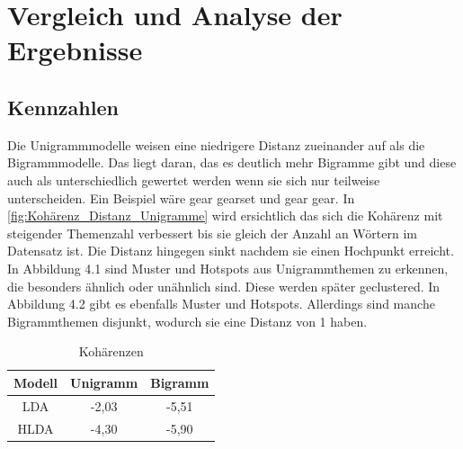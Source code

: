 \chapter{Vergleich und Analyse der Ergebnisse}




\section{Kennzahlen}

Die Unigrammmodelle weisen eine niedrigere Distanz zueinander auf als die Bigrammmodelle. Das liegt daran, das es deutlich mehr Bigramme gibt und diese auch als unterschiedlich gewertet werden wenn sie sich nur teilweise unterscheiden. Ein Beispiel wäre gear gearset und gear gear. In \ref{fig:Kohärenz_Distanz_Unigramme} wird ersichtlich das sich die Kohärenz mit steigender Themenzahl verbessert bis sie gleich der Anzahl an Wörtern im Datensatz ist. Die Distanz hingegen sinkt nachdem sie einen Hochpunkt erreicht. In Abbildung 4.1 sind Muster und Hotspots aus Unigrammthemen zu erkennen, die besonders ähnlich oder unähnlich sind. Diese werden später geclustered. In Abbildung 4.2 gibt es ebenfalls Muster und Hotspots. Allerdings sind manche Bigrammthemen disjunkt, wodurch sie eine Distanz von 1 haben. 

\begin{table}
	\RawFloats
	\centering
	\caption{Kohärenzen}
\begin{tabular}{|c|c|c|}
	\hline
	Modell & Unigramm & Bigramm \\
	\hline
	LDA & -2,03 & -5,51 \\
	\hline
	HLDA & -4,30 & -5,90 \\
	\hline
\end{tabular}
	\label{table:Kohärenzen}
\end{table} 

